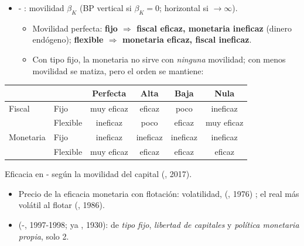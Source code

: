 \documentclass{article}
\begin{document}
\begin{columnas}
\begin{itemize}
\item {}- : movilidad $\beta_K$ (BP vertical si $\beta_K=0$; horizontal si $\to\infty$).
  \begin{itemize}
  \item Movilidad perfecta: \textbf{fijo $\Rightarrow$ fiscal eficaz, monetaria ineficaz} (dinero endógeno); \textbf{flexible $\Rightarrow$ monetaria eficaz, fiscal ineficaz}.
  \item Con tipo fijo, la monetaria no sirve con \emph{ninguna} movilidad; con menos movilidad se matiza, pero el orden se mantiene:
  \end{itemize}
\end{itemize}
{\centering\small
\begin{tabular}{@{}llcccc@{}}
\toprule
& & Perfecta & Alta & Baja & Nula\\
\midrule
Fiscal & Fijo & \textcolor{tceeverde}{muy eficaz} & \textcolor{tceeverde}{eficaz} & \textcolor{tceedorado}{poco} & \textcolor{tceerojo}{ineficaz}\\
 & Flexible & \textcolor{tceerojo}{ineficaz} & \textcolor{tceedorado}{poco} & \textcolor{tceeverde}{eficaz} & \textcolor{tceeverde}{muy eficaz}\\
Monetaria & Fijo & \textcolor{tceerojo}{ineficaz} & \textcolor{tceerojo}{ineficaz} & \textcolor{tceerojo}{ineficaz} & \textcolor{tceerojo}{ineficaz}\\
 & Flexible & \textcolor{tceeverde}{muy eficaz} & \textcolor{tceeverde}{eficaz} & \textcolor{tceeverde}{eficaz} & \textcolor{tceeverde}{eficaz}\\
\bottomrule
\end{tabular}\par}
{\footnotesize\color{tceegris} Eficacia en - según la movilidad del capital (, 2017).\par}
\begin{itemize}
\item Precio de la eficacia monetaria con flotación: volatilidad,  (, 1976) ; el real más volátil al flotar (, 1986).
\end{itemize}
\begin{itemize}
\item {} (-, 1997-1998; ya , 1930): de \emph{tipo fijo}, \emph{libertad de capitales} y \emph{política monetaria propia}, solo 2.

\end{itemize}
\end{columnas}
\end{document}
